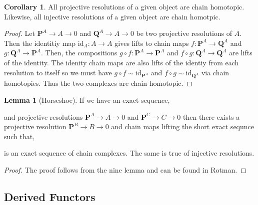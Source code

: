\documentclass[12pt]{article}
\newcommand{\id}{\mathrm{id}}
\theoremstyle{remark}
\theoremstyle{definition}
\newtheorem{lemma}[theorem]{Lemma}
\newtheorem{corollary}[theorem]{Corollary}
\begin{document}
\begin{corollary}
All projective resolutions of a given object are chain homotopic. Likewise, all injective resolutions of a given object are chain homotpic. 
\end{corollary}

\begin{proof}
Let $\mathbf{P}^A \longrightarrow A \longrightarrow 0$ and $\mathbf{Q}^A \longrightarrow A \longrightarrow 0$ be two projective resolutions of $A$. Then the identitiy map $\id_A : A \to A$ gives lifts to chain maps $f : \mathbf{P}^A \to \mathbf{Q}^A$ and $g : \mathbf{Q}^A \to \mathbf{P}^A$. Then, the compositions $g \circ f : \mathbf{P}^A \to \mathbf{P}^A$ and $f \circ g : \mathbf{Q}^A \to \mathbf{Q}^A$ are lifts of the identity. The idenity chain maps are also lifts of the identiy from each resolution to itself so we must have $g \circ f \sim \id_{\mathbf{P}^A}$ and $f \circ g \sim \id_{\mathbf{Q}^A}$ via chain homotopies. Thus the two complexes are chain homotopic.   
\end{proof}

\begin{lemma}[Horseshoe]
If we have an exact sequence,
\begin{center}
\end{center}
and projective resolutions $\mathbf{P}^A \longrightarrow A \longrightarrow 0$ and $\mathbf{P}^C \longrightarrow C \longrightarrow 0$ then there exists a projective resolution $\mathbf{P}^B \longrightarrow B \longrightarrow 0$ and chain maps lifting the short exact sequnce such that,
\begin{center}
\end{center}
is an exact sequence of chain complexes. The same is true of injective resolutions.
\end{lemma}

\begin{proof}
The proof follows from the nine lemma and can be found in Rotman.
\end{proof}

\subsection{Derived Functors}
\end{document}
